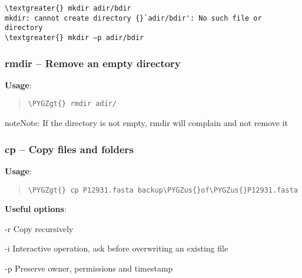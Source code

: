 \documentclass[a4paper,11pt,english]{sphinxmanual}
\def\PYGZus{\char`\_}
\def\PYGZgt{\char`\>}
\begin{document}
\begin{Verbatim}[frame=single, rulecolor=\color{lightgray}, fontfamily=courier, commandchars=\\\{\}]
\textgreater{} mkdir adir/bdir
mkdir: cannot create directory {}`adir/bdir': No such file or directory
\textgreater{} mkdir –p adir/bdir
\end{Verbatim}


\subsubsection{rmdir – Remove an empty directory}
\label{introduction:rmdir-remove-an-empty-directory}
\textbf{Usage}:  
\begin{quote}

\begin{Verbatim}[frame=single, rulecolor=\color{lightgray}, fontfamily=courier, commandchars=\\\{\}]
\PYGZgt{} rmdir adir/
\end{Verbatim}
\end{quote}

\begin{notice}{note}{Note:}
If the directory is not empty, rmdir will complain and not remove it
\end{notice}


\subsubsection{cp – Copy files and folders}
\label{introduction:cp-copy-files-and-folders}
\textbf{Usage}:  
\begin{quote}

\begin{Verbatim}[frame=single, rulecolor=\color{lightgray}, fontfamily=courier, commandchars=\\\{\}]
\PYGZgt{} cp P12931.fasta backup\PYGZus{}of\PYGZus{}P12931.fasta
\end{Verbatim}
\end{quote}

\textbf{Useful options}:
\begin{optionlist}{3cm}
\item [-r]  
Copy recursively
\item [-i]  
Interactive operation, ask before overwriting an existing file
\item [-p]  
Preserve owner, permissions and timestamp
\end{optionlist}
\end{document}
